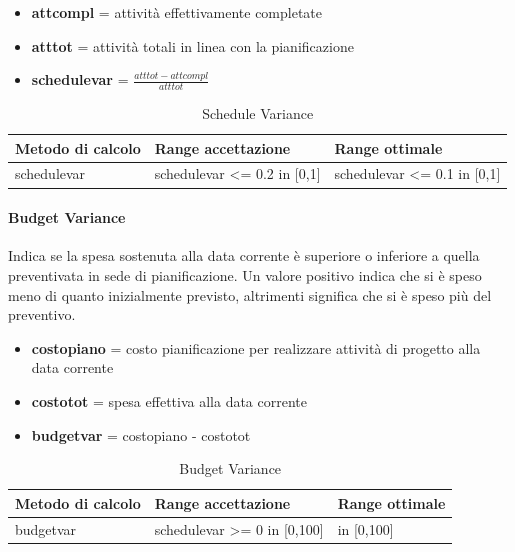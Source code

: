 				\begin{itemize}
				\item \textbf{attcompl} = attività effettivamente completate
				\item \textbf{atttot} = attività totali in linea con la pianificazione
				\item \textbf{schedulevar} = \begin{math}
				\frac{atttot - attcompl}{atttot}
				\end{math} 
			\end{itemize}
			
			\begin{table}[H]
				\begin{longtable}{>{\centering\arraybackslash}p{5cm}|>{\centering\arraybackslash}p{5cm} | >{\centering\arraybackslash}p{5cm}}
					\hline
					\rowcolor{Gray}
					\textbf{Metodo di calcolo} & \textbf{Range accettazione} & \textbf{Range ottimale} \\
					\hline
					schedulevar & schedulevar <= 0.2 in [0,1]  & schedulevar <= 0.1 in [0,1] 
				\end{longtable}
				\caption{Schedule Variance}
			\end{table}
			

		
		\paragraph{Budget Variance}
		Indica se la spesa sostenuta alla data corrente è superiore o inferiore a quella preventivata in sede di pianificazione.
		Un valore positivo indica che si è speso meno di quanto inizialmente previsto, altrimenti significa che si è speso più del preventivo.
		
		\begin{itemize}
			\item \textbf{costopiano} = costo pianificazione per realizzare attivit\`{a} di progetto alla data corrente
			\item \textbf{costotot} = spesa effettiva alla data corrente
			\item \textbf{budgetvar} = costopiano - costotot
		\end{itemize}
		
		\begin{table}[H]
			\begin{longtable}{>{\centering\arraybackslash}p{5cm}|>{\centering\arraybackslash}p{5cm} | >{\centering\arraybackslash}p{5cm}}
				\hline
				\rowcolor{Gray}
				\textbf{Metodo di calcolo} & \textbf{Range accettazione} & \textbf{Range ottimale} \\
				\hline
				budgetvar & schedulevar >= 0 in [0,100]  & 100 in [0,100] 
			\end{longtable}
			\caption{Budget Variance}
		\end{table}
		
